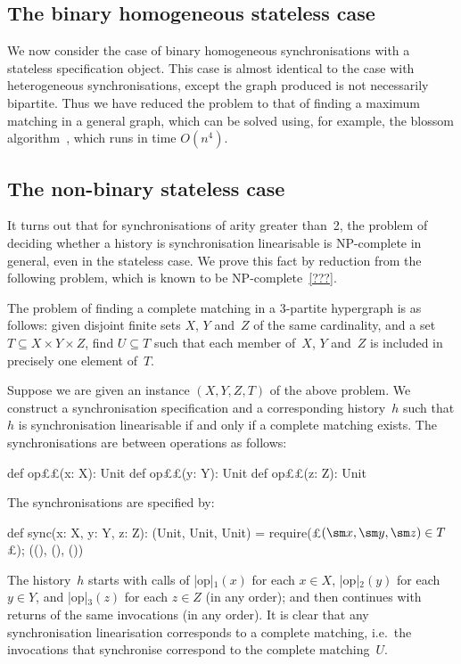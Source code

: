 \subsection{The binary homogeneous stateless case}
\label{sec:binary-homogeneous} 

We now consider the case of binary homogeneous synchronisations with a
stateless specification object.  This case is almost identical to the case
with heterogeneous synchronisations, except the graph produced is not
necessarily bipartite.  Thus we have reduced the problem to that of finding a
maximum matching in a general graph, which can be solved using, for example,
the blossom algorithm~\cite{edmonds_1965}, which runs in time $O(n^4)$.
  



\subsection{The non-binary  stateless case}
\label{sec:non-binary-stateless}

It turns out that for synchronisations of arity greater than~2, the problem of
deciding whether a history is synchronisation linearisable is NP-complete in
general, even in the stateless case.  We prove this fact by reduction from the
following problem, which is known to be NP-complete~\ref{???}.
%
\begin{definition}
The problem of finding a complete matching in a 3-partite hypergraph is as
follows: given disjoint finite sets $X$, $Y$ and~$Z$ of the same cardinality,
and a set $T \subseteq X \times Y \times Z$, find $U \subseteq T$ such that
each member of~$X$, $Y$ and~$Z$ is included in precisely one element of~$T$.
\end{definition}

Suppose we are given an instance $(X, Y, Z, T)$ of the above problem.  We
construct a synchronisation specification and a corresponding history~$h$ such
that $h$ is synchronisation linearisable if and only if a complete matching
exists.  The synchronisations are between operations as follows:
\begin{scala}
  def op££(x: X): Unit
  def op££(y: Y): Unit
  def op££(z: Z): Unit
\end{scala}
%
The synchronisations are specified by:
%
\begin{scala}
  def sync(x: X, y: Y, z: Z): (Unit, Unit, Unit) = {
    require(£$(\sm x, \sm y, \sm z) \in T$£); ((), (), ())
  }
\end{scala}
%
The history~$h$ starts with calls of |op|$_1(x)$ for each $x \in X$,
|op|$_2(y)$ for each $y \in Y$, and |op|$_3(z)$ for each $z \in Z$ (in any
order); and then continues with returns of the same invocations (in any
order).  It is clear that any synchronisation linearisation corresponds to a
complete matching, i.e.~the invocations that synchronise correspond to the
complete matching~$U$.
